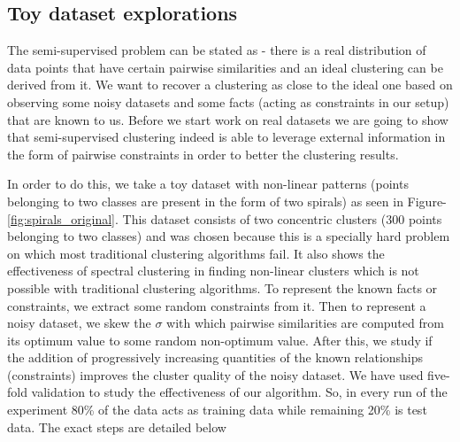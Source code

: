 \subsection{Toy dataset explorations} \label{chap2:sec:spirals_dataset}
The semi-supervised problem can be stated as - there is a real distribution of data points that have certain pairwise similarities and an ideal clustering can be derived from it. 
We want to recover a clustering as close to the ideal one based on observing some noisy datasets and some facts (acting as constraints in our setup) that are known to us. Before we start work on real datasets 
we are going to show that semi-supervised clustering indeed is able to leverage external information in the form of pairwise constraints in order to better the clustering results. 

In order to do this, we take a toy dataset with non-linear patterns (points belonging to two classes are present in the form of two spirals) as seen in Figure-\ref{fig:spirals_original}. This dataset consists of two concentric clusters (300 points belonging to two classes) and was chosen because this is a specially 
hard problem on which most traditional clustering algorithms fail. It also shows the effectiveness of spectral clustering in finding non-linear clusters which is not possible with 
traditional clustering algorithms. To represent the known facts or constraints, we extract some random constraints from it. Then to represent a noisy dataset, we skew the $\sigma$ with which pairwise similarities are computed from its optimum value to some random non-optimum value. After this, we study if the addition of progressively increasing quantities of the known relationships (constraints) improves the cluster quality of the noisy dataset.
We have used five-fold validation to study the effectiveness of our algorithm. So, in every run of the experiment 80\% of the data acts as training data 
while remaining 20\% is test data. The exact steps are detailed below 

